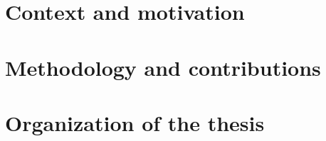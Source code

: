 \section{Context and motivation}
\section{Methodology and contributions}
\section{Organization of the thesis}

